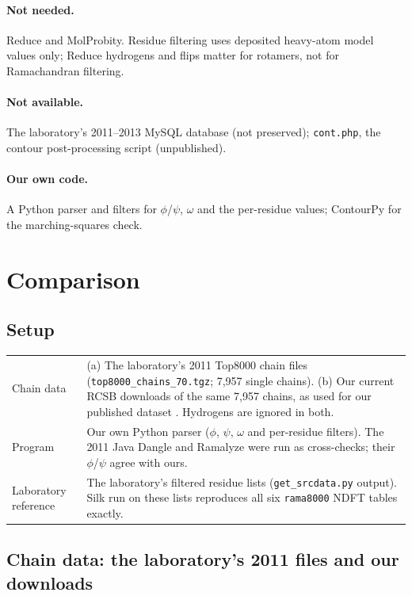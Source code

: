 \documentclass[11pt]{article}
\newcommand{\file}[1]{\texttt{#1}}
\begin{document}
\paragraph{Not needed.} Reduce and MolProbity. Residue filtering uses deposited heavy-atom model
values only; Reduce hydrogens and flips matter for rotamers, not for Ramachandran filtering.

\paragraph{Not available.} The laboratory's 2011--2013 MySQL database (not preserved);
\file{cont.php}, the contour post-processing script (unpublished).

\paragraph{Our own code.} A Python parser and filters for $\phi$/$\psi$, $\omega$ and the
per-residue values; ContourPy \cite{contourpy} for the marching-squares check.

\section{Comparison}

\subsection{Setup}

\begin{tabularx}{\linewidth}{@{}lX@{}}
  Chain data & (a) The laboratory's 2011 Top8000 chain files (\file{top8000\_chains\_70.tgz}; 7,957
    single chains). (b) Our current RCSB downloads of the same 7,957 chains, as used for our
    published dataset \cite{Top8000Zenodo}. Hydrogens are ignored in both. \\
  Program & Our own Python parser ($\phi$, $\psi$, $\omega$ and per-residue filters). The 2011
    Java Dangle and Ramalyze were run as cross-checks; their $\phi$/$\psi$ agree with ours. \\
  Laboratory reference & The laboratory's filtered residue lists (\file{get\_srcdata.py} output).
    Silk run on these lists reproduces all six \file{rama8000} NDFT tables exactly. \\
\end{tabularx}

\subsection{Chain data: the laboratory's 2011 files and our downloads}
\end{document}
